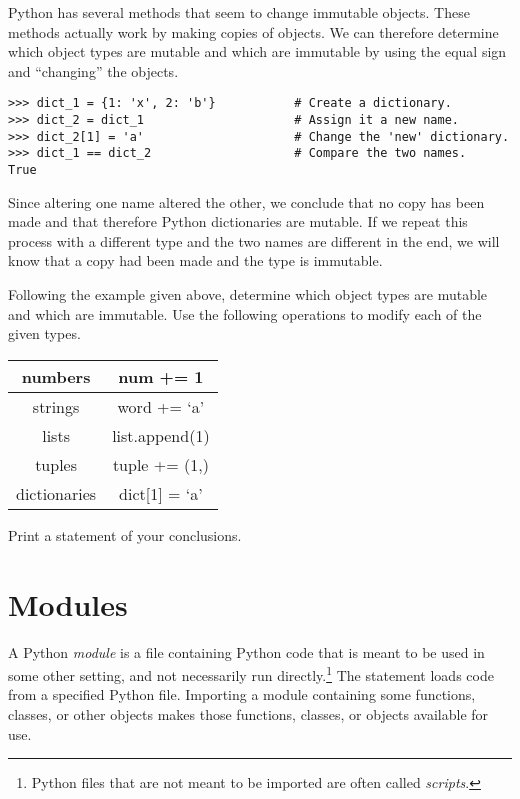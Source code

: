 \begin{problem} %
Python has several methods that seem to change immutable objects.
These methods actually work by making copies of objects.
We can therefore determine which object types are mutable and which are immutable by using the equal sign and ``changing'' the objects.

\begin{lstlisting}
>>> dict_1 = {1: 'x', 2: 'b'}           # Create a dictionary.
>>> dict_2 = dict_1                     # Assign it a new name.
>>> dict_2[1] = 'a'                     # Change the 'new' dictionary.
>>> dict_1 == dict_2                    # Compare the two names.
True
\end{lstlisting}

Since altering one name altered the other, we conclude that no copy has been made and that therefore Python dictionaries are mutable.
If we repeat this process with a different type and the two names are different in the end, we will know that a copy had been made and the type is immutable.

Following the example given above, determine which object types are mutable and which are immutable.
Use the following operations to modify each of the given types.

\begin{center}
\begin{tabular}{|c|c|}
\hline
numbers & num += 1 \\
\hline
strings & word += `a' \\
\hline
lists & list.append(1) \\
\hline
tuples & tuple += (1,) \\
\hline
dictionaries & dict[1] = `a' \\
\hline
\end{tabular}
\end{center}
Print a statement of your conclusions.
\end{problem}

\section*{Modules} %

A Python \emph{module} is a file containing Python code that is meant to be used in some other setting, and not necessarily run directly.\footnote{Python files that are not meant to be imported are often called \emph{scripts}.}
The  statement loads code from a specified Python file.
Importing a module containing some functions, classes, or other objects makes those functions, classes, or objects available for use.

